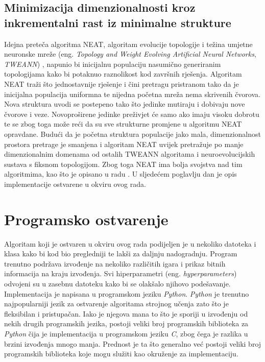 \documentclass[times, utf8, diplomski, numeric]{fer}
\begin{document}
\section{Minimizacija dimenzionalnosti kroz inkrementalni rast iz minimalne strukture}
Idejna preteča algoritma NEAT, algoritam evolucije topologije i težina umjetne neuronske mreže (eng. \textit{Topology and Weight Evolving Artificial Neural Networks}, \textit{TWEANN}) \citep{rad9}, napunio bi inicijalnu populaciju nasumično generiranim topologijama kako bi potaknuo raznolikost kod završnih rješenja. Algoritam NEAT traži što jednostavnije rješenje i čini pretragu pristranom tako da je inicijalna populacija uniformna te nijedna početna mreža nema skrivenih čvorova. Nova struktura uvodi se postepeno tako što jedinke mutiraju i dobivaju nove čvorove i veze. Novoproširene jedinke preživjet će samo ako imaju visoku dobrotu te se zbog toga može reći da su sve strukturne promjene u algoritmu NEAT opravdane. Budući da je početna struktura populacije jako mala, dimenzionalnost prostora pretrage je smanjena i algoritam NEAT uvijek pretražuje po manje dimenzionalnim domenama od ostalih TWEANN algoritama i neuroevolucijskih sustava s fiksnom topologijom. Zbog toga NEAT ima bolja svojstva nad tim algoritmima, kao što je opisano u radu \citep{rad5}. U sljedećem poglavlju dan je opis implementacije ostvarene u okviru ovog rada.

\chapter{Programsko ostvarenje}
Algoritam koji je ostvaren u okviru ovog rada podijeljen je u nekoliko datoteka i klasa kako bi kod bio pregledniji te lakši za daljnju nadogradnju. Program trenutno podržava izvođenje na nekoliko različitih igara i prikaz bitnih informacija na kraju izvođenja. Svi hiperparametri (eng. \textit{hyperparameters}) odvojeni su u zasebnu datoteku kako bi se olakšalo njihovo podešavanje. Implementacija je napisana u programskom jeziku \textit{Python}. \textit{Python} je trenutno najpopularniji jezik za ostvarenje algoritama strojnog učenja zato što je fleksibilan i pristupačan. Iako je njegova mana to što je sporiji u izvođenju od nekih drugih programskih jezika, postoji veliki broj programskih biblioteka za \textit{Python} čija je implementacija u programskom jeziku \textit{C}, zbog čega je razlika u brzini izvođenja mnogo manja. Prednost je ta što generalno već postoji veliki broj programskih biblioteka koje mogu služiti kao okruženje za implementaciju.
\end{document}
